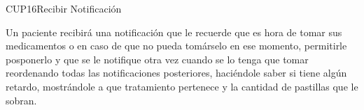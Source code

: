 \begin{UseCase}{CUP16}{Recibir Notificación}
    {
    	Un paciente recibirá una notificación que le recuerde que es hora de tomar sus medicamentos o en caso de que no pueda tomárselo en ese momento, permitirle posponerlo y que se le notifique otra vez cuando se lo tenga que tomar reordenando todas las notificaciones posteriores, haciéndole saber si tiene algún retardo, mostrándole a que tratamiento pertenece y la cantidad de pastillas que le sobran.
    	
    }
    

\end{UseCase}
